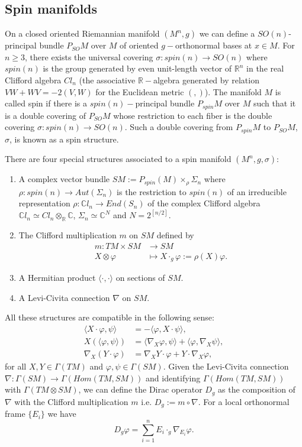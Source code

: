 \documentclass[11pt]{amsart}
\theoremstyle{plain}
\numberwithin{equation}{section}
\theoremstyle{plain}
\begin{document}
\subsection{Spin manifolds}
On a closed oriented Riemannian manifold $(M^n,g)$ we can define a $SO(n)$-principal bundle $P_{SO}M$ over $M$ of oriented $g-$orthonormal bases at $x\in M$. For $n\geq 3$, there exists the universal covering $\sigma:spin(n)\rightarrow SO(n)$ where $spin(n)$ is the group generated by even unit-length vector of $\mathbb{R}^n$ in the real Clifford algebra $Cl_n$ (the associative $\mathbb{R}-$algebra generated by relation $VW+WV=-2( V,W)$ for the Euclidean metric $(,)$). The manifold $M$ is called spin if there is a $spin(n)-$principal bundle $P_{spin}M$ over $M$ such that it is a double covering of $P_{SO}M$ whose restriction to each fiber is 
the double covering $\sigma:spin(n)\rightarrow SO(n)$. Such a double covering from $P_{spin}M$ to $P_{SO}M$, $\sigma$, is 
known as a spin structure. 

\medskip

There are  four special structures associated to a spin manifold $(M^n,g,\sigma)$:
\begin{enumerate}
\item A complex vector bundle $SM:=P_{spin}(M)\times_{\rho}\Sigma_n$ where $\rho:spin(n)\rightarrow Aut(\Sigma_n)$ is the restriction to $spin(n)$ of an irreducible representation $\rho:\mathbb{C}l_n\rightarrow End(S_n) $ of the complex Clifford algebra $\mathbb{C}l_n\simeq Cl_n\otimes_{\mathbb{R}} \mathbb{C}$,  $\Sigma_n\simeq\mathbb{C}^N$ and $N=2^{[n/2]}$.
\item The Clifford multiplication $m$ on $SM$ defined by
\begin{align*}
m:TM\times SM&\rightarrow SM\\
X\otimes\varphi&\mapsto X\cdot_g\varphi:=\rho(X)\varphi.
\end{align*} 
\item A Hermitian product $\langle\cdot,\cdot\rangle$ on sections of $SM$.

\item A Levi-Civita connection $\nabla$ on $SM$.
\end{enumerate}

All these structures are compatible in the following sense:
\begin{align*}
\langle X\cdot\varphi,\psi\rangle&=-\langle\varphi,X\cdot\psi\rangle, \\
X(\langle\varphi,\psi\rangle)&=\langle\nabla_X\varphi,\psi\rangle+\langle\varphi,\nabla_X\psi\rangle,\\
\nabla_X(Y\cdot\varphi)&=\nabla_XY\cdot\varphi+Y\cdot\nabla_X\varphi,
\end{align*}
for all $X,Y\in\Gamma(TM)$ and $\varphi,\psi\in\Gamma(SM)$.
Given the Levi-Civita  connection $\nabla:\Gamma(SM)\rightarrow\Gamma(Hom(TM,SM))$ and identifying $\Gamma(Hom(TM,SM))$ with $\Gamma(TM\otimes SM)$, we can define the Dirac operator $D_g$ as the composition of $\nabla$ with the Clifford multiplication $m$ i.e. $D_g:=m\circ \nabla$. For a local orthonormal frame $\{E_i\}$ we have $$D_g\varphi=\sum\limits_{i=1}^nE_i\cdot_g\nabla_{E_i}\varphi.$$
\end{document}
